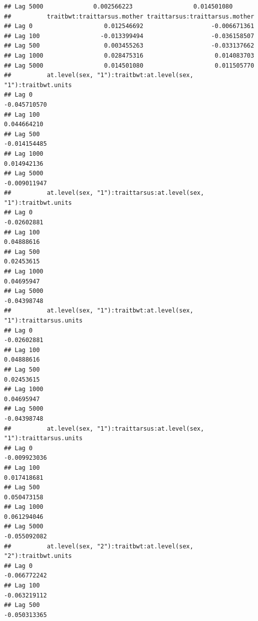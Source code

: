 \documentclass[
  12pt,
]{book}
\begin{document}
\begin{verbatim}
## Lag 5000              0.002566223                 0.014501080
##          traitbwt:traittarsus.mother traittarsus:traittarsus.mother
## Lag 0                    0.012546692                   -0.006671361
## Lag 100                 -0.013399494                   -0.036158507
## Lag 500                  0.003455263                   -0.033137662
## Lag 1000                 0.028475316                    0.014083703
## Lag 5000                 0.014501080                    0.011505770
##          at.level(sex, "1"):traitbwt:at.level(sex, "1"):traitbwt.units
## Lag 0                                                     -0.045710570
## Lag 100                                                    0.044664210
## Lag 500                                                   -0.014154485
## Lag 1000                                                   0.014942136
## Lag 5000                                                  -0.009011947
##          at.level(sex, "1"):traittarsus:at.level(sex, "1"):traitbwt.units
## Lag 0                                                         -0.02602881
## Lag 100                                                        0.04888616
## Lag 500                                                        0.02453615
## Lag 1000                                                       0.04695947
## Lag 5000                                                      -0.04398748
##          at.level(sex, "1"):traitbwt:at.level(sex, "1"):traittarsus.units
## Lag 0                                                         -0.02602881
## Lag 100                                                        0.04888616
## Lag 500                                                        0.02453615
## Lag 1000                                                       0.04695947
## Lag 5000                                                      -0.04398748
##          at.level(sex, "1"):traittarsus:at.level(sex, "1"):traittarsus.units
## Lag 0                                                           -0.009923036
## Lag 100                                                          0.017418681
## Lag 500                                                          0.050473158
## Lag 1000                                                         0.061294046
## Lag 5000                                                        -0.055092082
##          at.level(sex, "2"):traitbwt:at.level(sex, "2"):traitbwt.units
## Lag 0                                                     -0.066772242
## Lag 100                                                   -0.063219112
## Lag 500                                                   -0.050313365

\end{verbatim}
\end{document}
